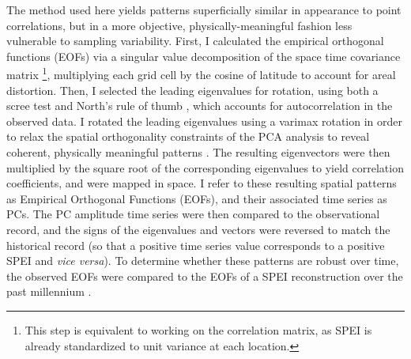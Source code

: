 \documentclass[11pt]{iopart}
\begin{document}
The method used here yields patterns superficially similar in appearance to point correlations, but in a more objective, physically-meaningful fashion less vulnerable to sampling variability. First, I calculated the empirical orthogonal functions (EOFs) via a singular value decomposition of the space time covariance matrix \footnote{This step is equivalent to working on the correlation matrix, as SPEI is already standardized to unit variance at each location.}, multiplying each grid cell by the cosine of latitude to account for areal distortion. Then, I selected the leading eigenvalues for rotation, using both a scree test and North's rule of thumb \parencite{North1982}, which accounts for autocorrelation in the observed data. I rotated the leading eigenvalues using a varimax rotation in order to relax the spatial orthogonality constraints of the PCA analysis to reveal coherent, physically meaningful patterns \parencite{Richman1986}. The resulting eigenvectors were then multiplied by the square root of the corresponding eigenvalues to yield correlation coefficients, and were mapped in space. I refer to these resulting spatial patterns as Empirical Orthogonal Functions (EOFs), and their associated time series as PCs. The PC amplitude time series were then compared to the observational record, and the signs of the eigenvalues and vectors were reversed to match the historical record (so that a positive time series value corresponds to a positive SPEI and \textit{vice versa}). To determine whether these patterns are robust over time, the observed EOFs were compared to the EOFs of a SPEI reconstruction over the past millennium \parencite{Steiger2018}.
\end{document}
